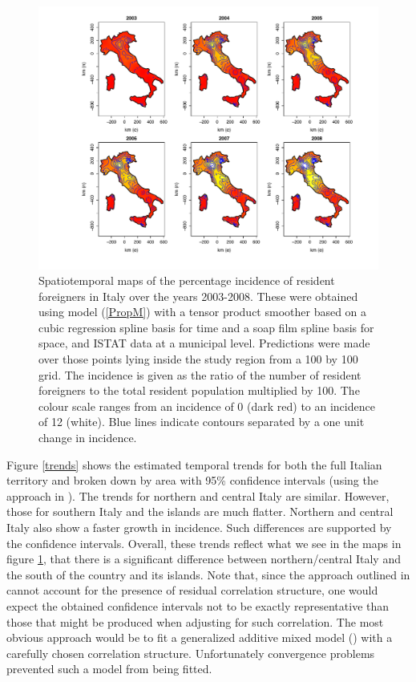\begin{figure}[t]
	\centering
		\includegraphics[width=\textwidth]{it/maps-Soap.pdf}
	\caption{Spatiotemporal maps of the percentage incidence of resident foreigners in Italy over the years 2003-2008. These were obtained using model (\ref{PropM}) with a tensor product smoother based on a cubic regression spline basis for time and a soap film spline basis for space, and ISTAT data at a municipal level. Predictions were made over those points lying inside the study region from a 100 by 100 grid. The incidence is given as the ratio of the number of resident foreigners to the total resident population multiplied by 100. The colour scale ranges from an incidence of 0 (dark red) to an incidence of 12 (white). Blue lines indicate contours separated by a one unit change in incidence.}
	\label{it-fig1}
\end{figure}

Figure \ref{trends} shows the estimated temporal trends for both the full Italian territory and broken down by area with 95\% confidence intervals (using the approach in ). The trends for northern and central Italy are similar. However, those for southern Italy and the islands are much flatter. Northern and central Italy also show a faster growth in incidence. Such differences are supported by the confidence intervals. Overall, these trends reflect what we see in the maps in figure \ref{it-fig1}, that there is a significant difference between northern/central Italy and the south of the country and its islands. Note that, since the approach outlined in  cannot account for the presence of residual correlation structure, one would expect the obtained confidence intervals not to be exactly representative than those that might be produced when adjusting for such correlation. The most obvious approach would be to fit a generalized additive mixed model (\cite[chapter 6]{simonbook}) with a carefully chosen correlation structure. Unfortunately convergence problems prevented such a model from being fitted.

